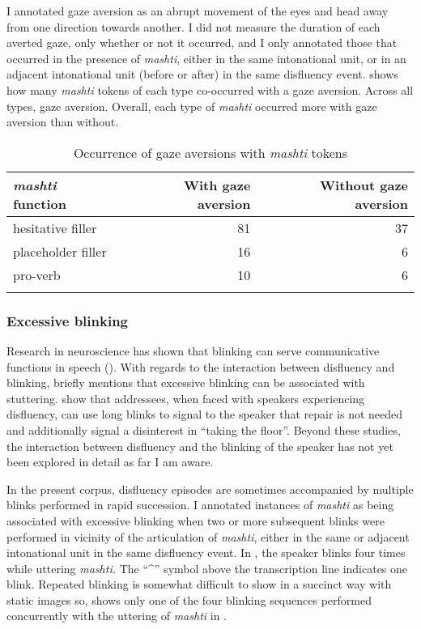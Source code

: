 \documentclass[output=paper]{langscibook}
\begin{document}
I annotated gaze aversion as an abrupt movement of the eyes and head away from one direction towards another. I did not measure the duration of each averted gaze, only whether or not it occurred, and I only annotated those that occurred in the presence of \textit{mashti}, either in the same intonational unit, or in an adjacent intonational unit (before or after) in the same disfluency event.  shows how many \textit{mashti} tokens of each type co-occurred with a gaze aversion. Across all types, gaze aversion. Overall, each type of \textit{mashti} occurred more with gaze aversion than without.


\begin{table}
\begin{tabular}{lrr}
\lsptoprule
\textit{mashti} function & With gaze aversion & Without gaze aversion\\
\midrule
hesitative filler & 81 & 37\\
placeholder filler & 16 & 6\\
pro-verb & 10 & 6\\
\lspbottomrule
\end{tabular}
\caption{\label{tab:rice:11}Occurrence of gaze aversions with \textit{mashti} tokens}
\end{table}

\subsubsection{Excessive blinking}
\label{sec:rice:4.2.2}
Research in neuroscience has shown that blinking can serve communicative functions in speech (\citealt{Mandel2014, Nakano2010}). With regards to the interaction between disfluency and blinking, \citet[382]{Lickley2017} briefly mentions that excessive blinking can be associated with stuttering.  \citet{Homke2017} show that addressees, when faced with speakers experiencing disfluency, can use long blinks to signal to the speaker that repair is not needed and additionally signal a disinterest in “taking the floor”. Beyond these studies, the interaction between disfluency and the blinking of the speaker has not yet been explored in detail as far I am aware. 

In the present corpus, disfluency episodes are sometimes accompanied by multiple blinks performed in rapid succession. I annotated instances of \textit{mashti} as being associated with excessive blinking when two or more subsequent blinks were performed in vicinity of the articulation of \textit{mashti}, either in the same or adjacent intonational unit in the same disfluency event. In , the speaker blinks four times while uttering \textit{mashti.} The “\^{}” symbol above the transcription line indicates one blink. Repeated blinking is somewhat difficult to show in a succinct way with static images so,  shows only one of the four blinking sequences performed concurrently with the uttering of \textit{mashti} in . 
\end{document}
